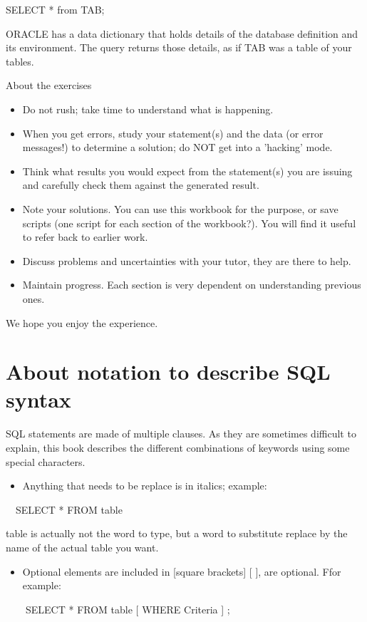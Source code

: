 SELECT  *  from TAB;

ORACLE has a data dictionary that holds details of the database definition and its environment.  The query returns those details, as if {\textquotedbl}TAB{\textquotedbl} was a table of your tables.

About the exercises

\begin{itemize}
\item Do not rush; take time to understand what is happening.
\item When you get errors, study your statement(s) and the data (or error messages!) to determine a solution; do NOT get into a 'hacking' mode.
\item Think what results you would expect from the statement(s) you are issuing and carefully check them against the generated result.
\item Note your solutions. You can use this workbook for the purpose, or save scripts (one script for each section of the workbook?).  You will find it useful to refer back to earlier work.
\item Discuss problems and uncertainties with your tutor, they are there to help.
\item Maintain progress. Each section is very dependent on understanding previous ones.
\end{itemize}
We hope you enjoy the experience.

\section{About notation to describe SQL syntax}
SQL statements are made of multiple clauses. As they are sometimes difficult to explain, this book describes the different combinations of keywords using some special characters.

\begin{itemize}
\item Anything that needs to be replace is in italics; example:
\end{itemize}
\ \ SELECT * FROM table

table is actually not the word to type, but a word to substitute replace by the name of the actual table you want.

\begin{itemize}
\item Optional elements are included in [square brackets] [ ], are optional. Ffor example:
\end{itemize}
\ \   \ \ SELECT * FROM table [ WHERE Criteria ] ;

